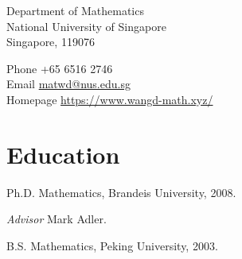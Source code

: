 
{\huge \name}


\bigskip

\begin{minipage}[t]{0.5\textwidth}
  Department of Mathematics \\
  National University of Singapore \\
  Singapore, 119076 \\
\end{minipage}
\begin{minipage}[t]{0.5\textwidth}
\end{minipage}
\begin{minipage}[t]{\textwidth}
Phone  +65 6516 2746 \\
Email  \href{mailto:matwd@nus.edu.sg}{matwd@nus.edu.sg} \\
Homepage  \href{https://www.wangd-math.xyz/}{{https://www.wangd-math.xyz/}}
\end{minipage}
\section*{Education }

\begin{item_list}
\item Ph.D. Mathematics, Brandeis University, 2008. \cn{\\}
    \begin{item_list}
    \item \textit{Advisor }
      Mark Adler.
    \end{item_list}
  \item B.S. Mathematics, %
    Peking University, 2003. \cn{\\}
\end{item_list}


